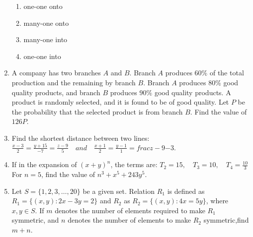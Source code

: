 \documentclass[journal,12pt,onecolumn]{IEEEtran}
\theoremstyle{remark}
\begin{document}
\begin{enumerate}
\begin{enumerate}
        \item one-one onto
        \item many-one onto
        \item many-one into
        \item one-one into
    \end{enumerate}
\item A company has two branches $A$ and $B$. Branch $A$ produces $60\%$ of the total production and the remaining by branch $B$. Branch $A$ produces $80\%$ good quality products, and branch $B$ produces $90\%$ good quality products. A product is randomly selected, and it is found to be of good quality. Let $P$ be the probability that the selected product is from branch $B$. Find the value of $126P$.
\item Find the shortest distance between two lines:
$\frac{x - 3}{2} = \frac{y + 15}{-7} = \frac{z - 9}{5} \quad and \quad \frac{x + 1}{2} = \frac{y - 1}{1} = frac{z-9}{-3}.$
\item If in the expansion of  $(x + y)^n$, the terms are:
$T_2 = 15, \quad T_3 = 10, \quad T_4 = \frac{10}{3}$ For $n = 5$,  find the value of  $n^3+x^5+243y^5$.
\item Let $S = \{1, 2, 3, \dots, 20\}$ be a given set. Relation $R_1$ is defined as $R_1 = \{(x, y) : 2x - 3y = 2\}$ and $R_2$ as $R_2 = \{(x, y) : 4x = 5y\}$, where $x, y \in S$. If $m$ denotes the number of elements required to make $R_1$ symmetric, and $n$ denotes the number of elements to make $R_2$ symmetric,find $m+n$.
\end{enumerate}
\end{document}
